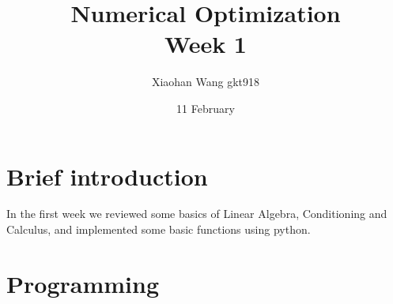 \documentclass[a4paper,12pt]{article}
\begin{document}
\title{Numerical Optimization \\ Week 1}
\author{Xiaohan Wang gkt918}
\date{11 February}
\maketitle

\section{Brief introduction}
In the first week we reviewed some basics of Linear Algebra, Conditioning and Calculus, and implemented some basic functions using python.
\section{Programming}
\end{document}
